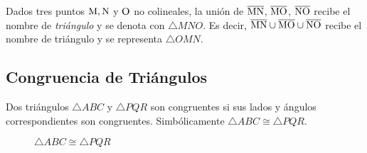 \begin{definition}
    Dados tres puntos $\rm M,N$ y $\rm O$ no colineales, la unión de $\overline{\rm MN}$, $\overline{\rm MO}$, $\overline{\rm NO}$ recibe el nombre de \textit{triángulo} y se denota con $\triangle{MNO}$. Es decir, $\overline{\rm MN} \cup \overline{\rm MO} \cup \overline{\rm NO}$ recibe el nombre de triángulo y se representa $\triangle{OMN}$.

    \begin{figure}[!h]
        \centering
        
        \label{fig:triangle}
    \end{figure}
    
\end{definition}

\subsection{Congruencia de Triángulos}

\begin{definition}
    Dos triángulos $\triangle{ABC}$ y $\triangle{PQR}$ son congruentes si sus lados y ángulos correspondientes son congruentes. Simbólicamente $\triangle{ABC} \cong \triangle{PQR}$.

    \begin{figure}[h!]

        \centering

        \begin{subfigure}[b]{.5\textwidth}
            \centering
            
            \label{fig:triag-congruence-1}
        \end{subfigure}%
        \begin{subfigure}[b]{.5\textwidth}
            \centering
            
            \label{fig:triag-congruence-2}
        \end{subfigure}

        \centering
        \caption{$\triangle{ABC} \cong \triangle{PQR}$}
        \label{fig:triang-congruence}
        
    \end{figure}    
    
\end{definition}

